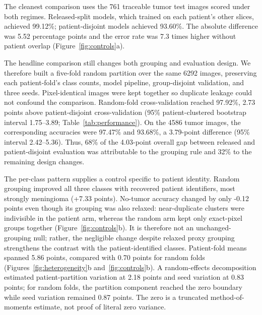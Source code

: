 ﻿\documentclass[11pt]{article}
\begin{document}
The cleanest comparison uses the 761 traceable tumor test images scored under both regimes. Released-split models, which trained on each patient's other slices, achieved 99.12\%; patient-disjoint models achieved 93.60\%. The absolute difference was 5.52 percentage points and the error rate was 7.3 times higher without patient overlap (Figure~\ref{fig:controls}a).

The headline comparison still changes both grouping and evaluation design. We therefore built a five-fold random partition over the same 6292 images, preserving each patient-fold's class counts, model pipeline, group-disjoint validation, and three seeds. Pixel-identical images were kept together so duplicate leakage could not confound the comparison. Random-fold cross-validation reached 97.92\%, 2.73 points above patient-disjoint cross-validation (95\% patient-clustered bootstrap interval 1.75--3.89; Table~\ref{tab:performance}). On the 4586 tumor images, the corresponding accuracies were 97.47\% and 93.68\%, a 3.79-point difference (95\% interval 2.42--5.36). Thus, 68\% of the 4.03-point overall gap between released and patient-disjoint evaluation was attributable to the grouping rule and 32\% to the remaining design changes.

The per-class pattern supplies a control specific to patient identity. Random grouping improved all three classes with recovered patient identifiers, most strongly meningioma (+7.33 points). No-tumor accuracy changed by only -0.12 points even though its grouping was also relaxed: near-duplicate clusters were indivisible in the patient arm, whereas the random arm kept only exact-pixel groups together (Figure~\ref{fig:controls}b). It is therefore not an unchanged-grouping null; rather, the negligible change despite relaxed proxy grouping strengthens the contrast with the patient-identified classes. Patient-fold means spanned 5.86 points, compared with 0.70 points for random folds (Figures~\ref{fig:heterogeneity}b and~\ref{fig:controls}b). A random-effects decomposition estimated patient-partition variation at 2.18 points and seed variation at 0.83 points; for random folds, the partition component reached the zero boundary while seed variation remained 0.87 points. The zero is a truncated method-of-moments estimate, not proof of literal zero variance.
\end{document}
